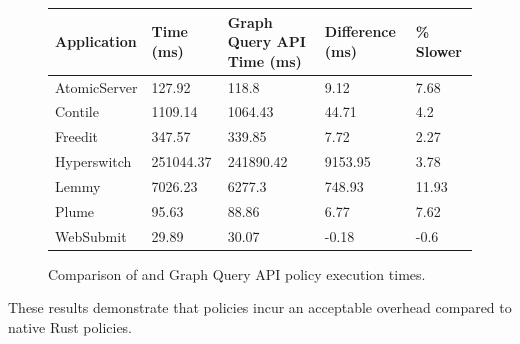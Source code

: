 \begin{figure}
    \begin{tabular}{|l|p{3cm}|p{3.5cm}|p{2cm}|p{3cm}|}
        \hline
        \textbf{Application} & \textbf{\syslang{} Time (ms)} & \textbf{Graph Query API Time (ms)} & \textbf{Difference (ms)} & \textbf{\syslang{} \% Slower} \\ \hline
        AtomicServer & 127.92    & 118.8     & 9.12    & 7.68  \\ \hline
        Contile      & 1109.14   & 1064.43   & 44.71   & 4.2   \\ \hline
        Freedit      & 347.57    & 339.85    & 7.72    & 2.27  \\ \hline
        Hyperswitch  & 251044.37 & 241890.42 & 9153.95 & 3.78  \\ \hline
        Lemmy        & 7026.23   & 6277.3    & 748.93  & 11.93 \\ \hline
        Plume        & 95.63     & 88.86     & 6.77    & 7.62  \\ \hline
        WebSubmit    & 29.89     & 30.07     & -0.18   & -0.6  \\ \hline               
        \end{tabular}
        \caption{Comparison of \syslang{} and Graph Query API policy execution times.}
        \label{f:percentages}
\end{figure}
%
These results demonstrate that \syslang{} policies incur an acceptable overhead compared to native Rust policies.
